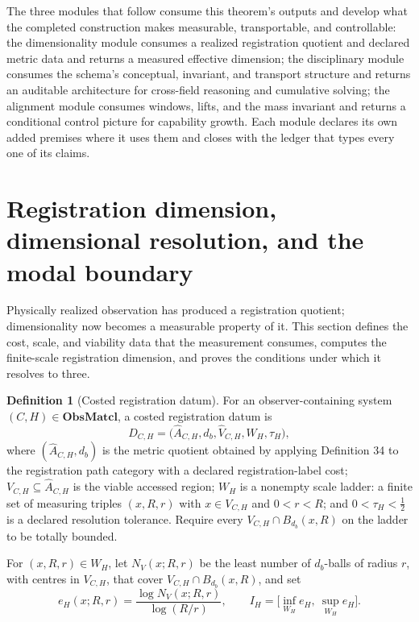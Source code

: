\documentclass[11pt]{article}
\theoremstyle{definition}
\newtheorem{definition}{Definition}
\newcommand{\ObsMatcl}{\mathbf{ObsMatcl}}
\begin{document}
The three modules that follow consume this theorem's outputs and develop what the completed construction makes measurable, transportable, and controllable: the dimensionality module consumes a realized registration quotient and declared metric data and returns a measured effective dimension; the disciplinary module consumes the schema's conceptual, invariant, and transport structure and returns an auditable architecture for cross-field reasoning and cumulative solving; the alignment module consumes windows, lifts, and the mass invariant and returns a conditional control picture for capability growth. Each module declares its own added premises where it uses them and closes with the ledger that types every one of its claims.

\section{Registration dimension, dimensional resolution, and the modal boundary}

Physically realized observation has produced a registration quotient; dimensionality now becomes a measurable property of it. This section defines the cost, scale, and viability data that the measurement consumes, computes the finite-scale registration dimension, and proves the conditions under which it resolves to three.

\begin{definition}[Costed registration datum]
For an observer-containing system $(C, H) \in \ObsMatcl$, a costed registration datum is
\[
D_{C,H} = \big(\widehat{A}_{C,H}, d_b, \widehat{V}_{C,H}, W_H, \tau_H\big),
\]
where $(\widehat{A}_{C,H}, d_b)$ is the metric quotient obtained by applying Definition 34 to the registration path category with a declared registration-label cost; $V_{C,H} \subseteq \widehat{A}_{C,H}$ is the viable accessed region; $W_H$ is a nonempty scale ladder: a finite set of measuring triples $(x, R, r)$ with $x \in V_{C,H}$ and $0 < r < R$; and $0 < \tau_H < \tfrac{1}{2}$ is a declared resolution tolerance. Require every $V_{C,H} \cap B_{d_b}(x, R)$ on the ladder to be totally bounded.

For $(x, R, r) \in W_H$, let $N_V(x; R, r)$ be the least number of $d_b$-balls of radius $r$, with centres in $V_{C,H}$, that cover $V_{C,H} \cap B_{d_b}(x, R)$, and set
\begin{equation}
e_H(x; R, r) = \frac{\log N_V(x; R, r)}{\log(R/r)}, \qquad I_H = \Big[\inf_{W_H} e_H,\ \sup_{W_H} e_H\Big]. \tag{S16}
\end{equation}
\end{definition}
\end{document}
